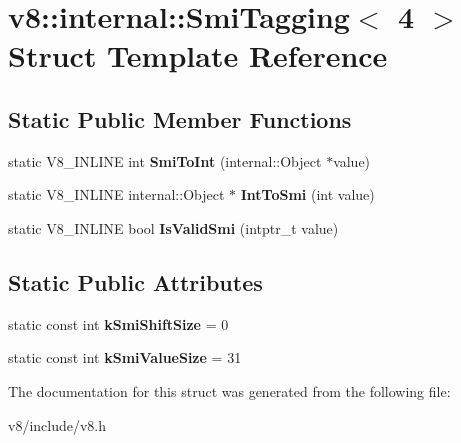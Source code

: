 \hypertarget{structv8_1_1internal_1_1SmiTagging_3_014_01_4}{\section{v8\-:\-:internal\-:\-:Smi\-Tagging$<$ 4 $>$ Struct Template Reference}
\label{structv8_1_1internal_1_1SmiTagging_3_014_01_4}
}
\subsection*{Static Public Member Functions}
\begin{DoxyCompactItemize}
\item 
\hypertarget{structv8_1_1internal_1_1SmiTagging_3_014_01_4_a31da2e4e3969d4c61a46d59639d6e92f}{static V8\-\_\-\-I\-N\-L\-I\-N\-E int {\bfseries Smi\-To\-Int} (internal\-::\-Object $\ast$value)}\label{structv8_1_1internal_1_1SmiTagging_3_014_01_4_a31da2e4e3969d4c61a46d59639d6e92f}

\item 
\hypertarget{structv8_1_1internal_1_1SmiTagging_3_014_01_4_abbc2788d901a590f3b9276e7e0d4059b}{static V8\-\_\-\-I\-N\-L\-I\-N\-E internal\-::\-Object $\ast$ {\bfseries Int\-To\-Smi} (int value)}\label{structv8_1_1internal_1_1SmiTagging_3_014_01_4_abbc2788d901a590f3b9276e7e0d4059b}

\item 
\hypertarget{structv8_1_1internal_1_1SmiTagging_3_014_01_4_a7ca3b3a7b14e2fbea5decac3675ac619}{static V8\-\_\-\-I\-N\-L\-I\-N\-E bool {\bfseries Is\-Valid\-Smi} (intptr\-\_\-t value)}\label{structv8_1_1internal_1_1SmiTagging_3_014_01_4_a7ca3b3a7b14e2fbea5decac3675ac619}

\end{DoxyCompactItemize}
\subsection*{Static Public Attributes}
\begin{DoxyCompactItemize}
\item 
\hypertarget{structv8_1_1internal_1_1SmiTagging_3_014_01_4_a4230f8d72054619f8141d0524733d8e9}{static const int {\bfseries k\-Smi\-Shift\-Size} = 0}\label{structv8_1_1internal_1_1SmiTagging_3_014_01_4_a4230f8d72054619f8141d0524733d8e9}

\item 
\hypertarget{structv8_1_1internal_1_1SmiTagging_3_014_01_4_a0857bbaab799b39a51f578744bf855f8}{static const int {\bfseries k\-Smi\-Value\-Size} = 31}\label{structv8_1_1internal_1_1SmiTagging_3_014_01_4_a0857bbaab799b39a51f578744bf855f8}

\end{DoxyCompactItemize}


The documentation for this struct was generated from the following file\-:\begin{DoxyCompactItemize}
\item 
v8/include/v8.\-h\end{DoxyCompactItemize}
